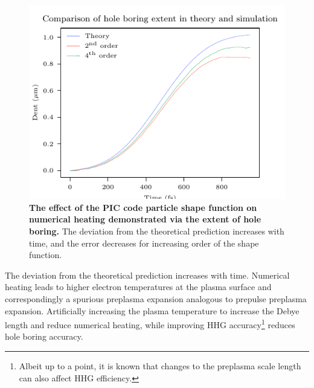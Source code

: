 \begin{figure}
	\centering
	\includegraphics{figures/orion/orion_compare_ion_denting_to_theory}
	\caption[The effect of the PIC code particle shape function on numerical heating.]{\textbf{The effect of the PIC code particle shape function on numerical heating demonstrated via the extent of hole boring.} The deviation from the theoretical prediction increases with time, and the error decreases for increasing order of the shape function.}
	\label{fig:orioncompareiondentingtotheory}
\end{figure}
The deviation from the theoretical prediction increases with time. Numerical heating leads to higher electron temperatures at the plasma surface and correspondingly a spurious preplasma expansion analogous to prepulse preplasma expansion. Artificially increasing the plasma temperature to increase the Debye length and reduce numerical heating, while improving HHG accuracy\footnote{Albeit up to a point, it is known that changes to the preplasma scale length can also affect HHG efficiency.} reduces hole boring accuracy.


